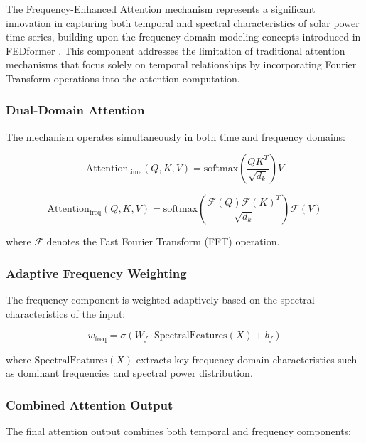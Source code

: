 \documentclass[12pt]{uomthesis}
\begin{document}
The Frequency-Enhanced Attention mechanism represents a significant innovation in capturing both temporal and spectral characteristics of solar power time series, building upon the frequency domain modeling concepts introduced in FEDformer \cite{zhou2022fedformer}. This component addresses the limitation of traditional attention mechanisms that focus solely on temporal relationships by incorporating Fourier Transform operations into the attention computation.

\subsubsection{Dual-Domain Attention}

The mechanism operates simultaneously in both time and frequency domains:

\begin{equation}
\text{Attention}_{\text{time}}(Q, K, V) = \text{softmax}\left(\frac{QK^T}{\sqrt{d_k}}\right)V
\end{equation}

\begin{equation}
\text{Attention}_{\text{freq}}(Q, K, V) = \text{softmax}\left(\frac{\mathcal{F}(Q)\mathcal{F}(K)^T}{\sqrt{d_k}}\right)\mathcal{F}(V)
\end{equation}

where $\mathcal{F}$ denotes the Fast Fourier Transform (FFT) operation.

\subsubsection{Adaptive Frequency Weighting}

The frequency component is weighted adaptively based on the spectral characteristics of the input:

\begin{equation}
w_{\text{freq}} = \sigma\left(W_f \cdot \text{SpectralFeatures}(X) + b_f\right)
\end{equation}

where $\text{SpectralFeatures}(X)$ extracts key frequency domain characteristics such as dominant frequencies and spectral power distribution.

\subsubsection{Combined Attention Output}

The final attention output combines both temporal and frequency components:
\end{document}
